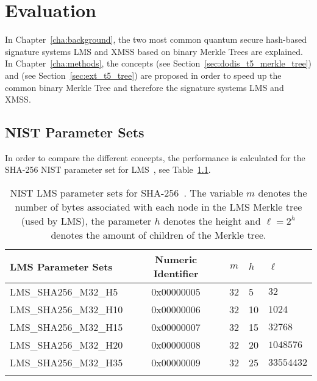 \chapter{Evaluation}
\label{cha:evaluation}
In Chapter~\ref{cha:background}, the two most common quantum secure hash-based signature systems LMS and XMSS based on binary Merkle Trees are explained. In Chapter~\ref{cha:methods}, the concepts \tftree (see Section~\ref{sec:dodis_t5_merkle_tree}) and \extree (see Section~\ref{sec:ext_t5_tree}) are proposed in order to speed up the common binary Merkle Tree and therefore the signature systems LMS and XMSS. 

\section{NIST Parameter Sets}
In order to compare the different concepts, the performance is calculated for the SHA-256 NIST parameter set for LMS~\cite{stateful_hashbased_sign_schemes_NIST_2020}, see Table~\ref{table:nist_param_lms}. 

\begin{table}
\centering
\begin{tabular}{l c c l l} 
 \hline\noalign{\smallskip}
 \textbf{LMS Parameter Sets} & \textbf{Numeric Identifier} & \textbf{$m$} & \textbf{$h$} & $\ell$ \\
 \hline\noalign{\smallskip}
 LMS\_SHA256\_M32\_H5 & 0x00000005  & 32 & 5 & $32$ \\
 LMS\_SHA256\_M32\_H10 & 0x00000006  & 32 & 10 & $1024$ \\
 LMS\_SHA256\_M32\_H15 & 0x00000007  & 32 & 15 & $32768$ \\
 LMS\_SHA256\_M32\_H20 & 0x00000008  & 32 & 20 & $1048576$ \\
 LMS\_SHA256\_M32\_H35 & 0x00000009  & 32 & 25 & $33554432$ \\
 \hline\noalign{\smallskip}
 \end{tabular}
\caption{NIST LMS parameter sets for SHA-256~\cite{stateful_hashbased_sign_schemes_NIST_2020}. The variable $m$ denotes the number of bytes associated with each node in the LMS Merkle tree (used by LMS), the parameter $h$ denotes the height and $\ell = 2^h$ denotes the amount of children of the Merkle tree.} %
\label{table:nist_param_lms}
\end{table}

